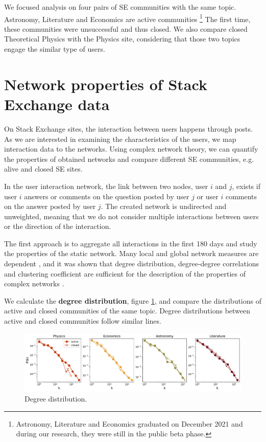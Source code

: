 We focused analysis on four pairs of SE communities with the same topic. Astronomy, Literature and Economics are active communities \footnote{Astronomy, Literature and Economics graduated on December 2021 and during our research, they were still in the public beta phase.} The first time, these communities were unsuccessful and thus closed. We also compare closed Theoretical Physics with the Physics site, considering that those two topics engage the similar type of users. 

\section{Network properties of Stack Exchange data}

On Stack Exchange sites, the interaction between users happens through posts. As we are interested in examining the characteristics of the users, we map interaction data to the networks. Using complex network theory, we can quantify the properties of obtained networks and compare different SE communities, e.g. alive and closed SE sites. 

In the user interaction network, the link between two nodes, user $i$ and $j$, exists if user $i$ answers or comments on the question posted by user $j$ or user $i$ comments on the answer posted by user $j$. The created network is undirected and unweighted, meaning that we do not consider multiple interactions between users or the direction of the interaction. 

The first approach is to aggregate all interactions in the first 180 days and study the properties of the static network. Many local and global network measures are dependent 
\cite{boccaletti2006complex}, and it was shown that degree distribution, degree-degree correlations and clustering coefficient are sufficient for the description of the properties of complex networks \cite{orsini2015quantifying}. 

We calculate the \textbf{degree distribution}, figure \ref{fig:fullnetdeg}, and compare the distributions of active and closed communities of the same topic. Degree distributions between active and closed communities follow similar lines. 

\begin{figure}[ht]
	\centering
	\includegraphics[width=\linewidth]{figures/stackexchange/degree_distribution_fullnet.pdf}
	\caption{Degree distribution.}
	\label{fig:fullnetdeg}
\end{figure}

